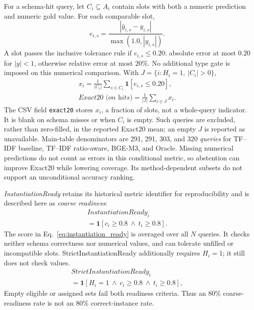 \documentclass[pdflatex,iicol,sn-basic,Numbered]{sn-jnl}
\begin{document}
For a schema-hit query, let $C_i\subseteq A_i$ contain slots with both a numeric prediction and numeric gold value. For each comparable slot,
\begin{equation}
 e_{i,s}=\frac{|\hat{y}_{i,s}-y_{i,s}|}{\max(1.0,|y_{i,s}|)}.
\label{eq:bounded_error}
\end{equation}
A slot passes the inclusive tolerance rule if $e_{i,s}\leq0.20$: absolute error at most $0.20$ for $|y|<1$, otherwise relative error at most $20\%$. No additional type gate is imposed on this numerical comparison. With $J=\{i:H_i=1,\ |C_i|>0\}$,
\begin{equation}
\begin{gathered}
x_i=\frac{1}{|C_i|}\sum_{s\in C_i}\mathbf{1}[e_{i,s}\leq0.20],
\\[3pt]
\textit{Exact20 (on hits)}=\frac{1}{|J|}\sum_{i\in J}x_i.
\end{gathered}
\label{eq:exact20}
\end{equation}
The CSV field \texttt{exact20} stores $x_i$, a fraction of slots, not a whole-query indicator. It is blank on schema misses or when $C_i$ is empty. Such queries are excluded, rather than zero-filled, in the reported Exact20 mean; an empty $J$ is reported as unavailable. Main-table denominators are 291, 291, 303, and 320 \emph{queries} for TF--IDF baseline, TF--IDF ratio-aware, BGE-M3, and Oracle. Missing numerical predictions do not count as errors in this conditional metric, so abstention can improve Exact20 while lowering coverage. Its method-dependent subsets do not support an unconditional accuracy ranking.

\textit{InstantiationReady} retains its historical metric identifier for reproducibility and is described here as \emph{coarse readiness}:
\begin{equation}
\begin{gathered}
\mathit{InstantiationReady}_i\\[2pt]
=\mathbf{1}[c_i\geq0.8\ \wedge\ t_i\geq0.8].
\end{gathered}
\label{eq:instantiation_ready}
\end{equation}
The score in Eq.~\eqref{eq:instantiation_ready} is averaged over all $N$ queries. It checks neither schema correctness nor numerical values, and can tolerate unfilled or incompatible slots. StrictInstantiationReady additionally requires $H_i=1$; it still does not check values.
\begin{equation}
\begin{gathered}
\mathit{StrictInstantiationReady}_i\\[2pt]
= \mathbf{1}[H_i=1\ \wedge\ c_i\geq0.8\ \wedge\ t_i\geq0.8],
\end{gathered}
\label{eq:strict_instantiation_ready}
\end{equation} Empty eligible or assigned sets fail both readiness criteria. Thus an $80\%$ coarse-readiness rate is not an $80\%$ correct-instance rate.
\end{document}
